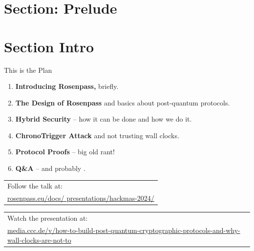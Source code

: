 \section{Section: Prelude}

\section{Section Intro}

\begin{frame}[s]{This is the Plan}
  \small
  \begin{enumerate}
    \item \textbf{Introducing Rosenpass,} briefly.
    \item \textbf{The Design of Rosenpass} and basics about post-quantum protocols.
    \item \textbf{Hybrid Security} – how it can be done and how we do it.
    \item \textbf{ChronoTrigger Attack} and not trusting wall clocks.
    \item \textbf{Protocol Proofs} – big old rant!
    \item \textbf{Q\&A} – and probably .
  \end{enumerate}

	\vfill

    \begin{tabular}[c]{@{\space}l}
    Follow the talk at:\\
    \footnotesize\href{rosenpass.eu/docs/presentations/hackmas-2024/}{rosenpass.eu/docs/ presentations/hackmas-2024/}
    \end{tabular}

  \vfill

    \begin{tabular}[c]{@{\space}l}
    Watch the presentation at:\\
    \tiny\href{media.ccc.de/v/how-to-build-post-quantum-cryptographic-protocols-and-why-wall-clocks-are-not-to}{media.ccc.de/v/how-to-build-post-quantum-cryptographic-protocols-and-why-wall-clocks-are-not-to}
    \end{tabular}

  \vfill
\end{frame}



